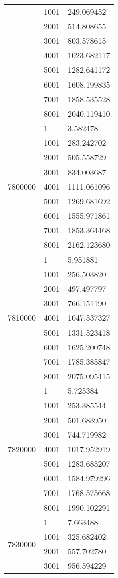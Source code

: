 \begin{table}[htb!]
\begin{tabular}{lll}
 & 1001 & 249.069452 \\
 & 2001 & 514.808655 \\
 & 3001 & 803.578615 \\
 & 4001 & 1023.682117 \\
 & 5001 & 1282.641172 \\
 & 6001 & 1608.199835 \\
 & 7001 & 1858.535528 \\
 & 8001 & 2040.119410 \\
\multirow[c]{9}{*}{7800000} & 1 & 3.582478 \\
 & 1001 & 283.242702 \\
 & 2001 & 505.558729 \\
 & 3001 & 834.003687 \\
 & 4001 & 1111.061096 \\
 & 5001 & 1269.681692 \\
 & 6001 & 1555.971861 \\
 & 7001 & 1853.364468 \\
 & 8001 & 2162.123680 \\
\multirow[c]{9}{*}{7810000} & 1 & 5.951881 \\
 & 1001 & 256.503820 \\
 & 2001 & 497.497797 \\
 & 3001 & 766.151190 \\
 & 4001 & 1047.537327 \\
 & 5001 & 1331.523418 \\
 & 6001 & 1625.200748 \\
 & 7001 & 1785.385847 \\
 & 8001 & 2075.095415 \\
\multirow[c]{9}{*}{7820000} & 1 & 5.725384 \\
 & 1001 & 253.385544 \\
 & 2001 & 501.683950 \\
 & 3001 & 744.719982 \\
 & 4001 & 1017.952919 \\
 & 5001 & 1283.685207 \\
 & 6001 & 1584.979296 \\
 & 7001 & 1768.575668 \\
 & 8001 & 1990.102291 \\
\multirow[c]{9}{*}{7830000} & 1 & 7.663488 \\
 & 1001 & 325.682402 \\
 & 2001 & 557.702780 \\
 & 3001 & 956.594229 \\

\end{tabular}
\end{table}
